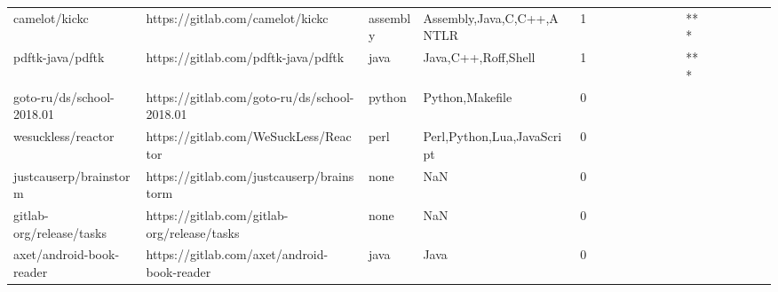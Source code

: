 \begin{tabular}{llllrlllllllllllll}
camelot/kickc                                      &                   https://gitlab.com/camelot/kickc &          assembly &                          Assembly,Java,C,C++,ANTLR &       1 &         &        &           &                &                 &        &           &       *** &          &          &       &              &          \\
pdftk-java/pdftk                                   &                https://gitlab.com/pdftk-java/pdftk &              java &                                Java,C++,Roff,Shell &       1 &         &        &           &                &                 &        &           &       *** &          &          &       &              &          \\
goto-ru/ds/school-2018.01                          &       https://gitlab.com/goto-ru/ds/school-2018.01 &            python &                                    Python,Makefile &       0 &         &        &           &                &                 &        &           &           &          &          &       &              &          \\
wesuckless/reactor                                 &              https://gitlab.com/WeSuckLess/Reactor &              perl &                         Perl,Python,Lua,JavaScript &       0 &         &        &           &                &                 &        &           &           &          &          &       &              &          \\
justcauserp/brainstorm                             &          https://gitlab.com/justcauserp/brainstorm &              none &                                                NaN &       0 &         &        &           &                &                 &        &           &           &          &          &       &              &          \\
gitlab-org/release/tasks                           &        https://gitlab.com/gitlab-org/release/tasks &              none &                                                NaN &       0 &         &        &           &                &                 &        &           &           &          &          &       &              &          \\
axet/android-book-reader                           &        https://gitlab.com/axet/android-book-reader &              java &                                               Java &       0 &         &        &           &                &                 &        &           &           &          &          &       &              &          \\

\end{tabular}
